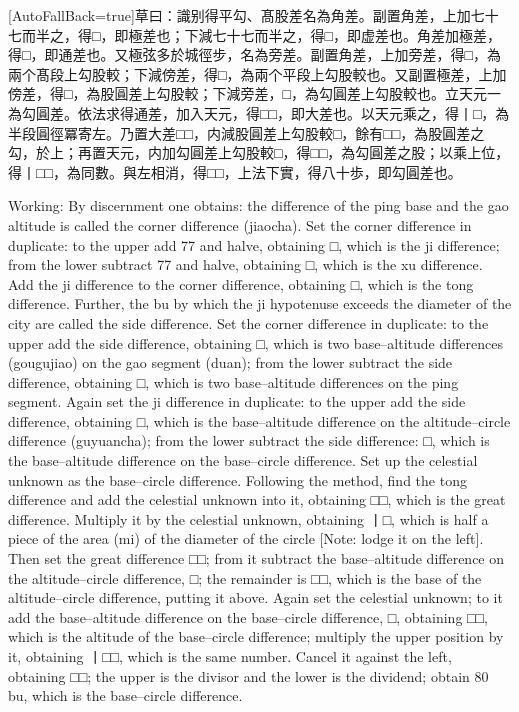 \documentclass[11pt]{article}
\newcommand{\zhsmall}{\footnotesize\color{black!70}}
\newcommand{\unitlabel}[1]{\marginpar{\raggedleft\tiny\color{gray}#1}}
\newenvironment{unitzh}{\par\CJKfontspec{Noto Serif CJK SC}[AutoFallBack=true]\large\linespread{1.25}\selectfont}{\par}
\newenvironment{uniten}{\par\small\color{black!85}}{\par\medskip}
\begin{document}
\begin{unitzh}\unitlabel{ceyuan-024.20}草曰：識别得平勾、髙股差名為角差。副置角差，上加七十七而半之，得□，即極差也；下減七十七而半之，得□，即虚差也。角差加極差，得□，即通差也。又極弦多於城徑步，名為旁差。副置角差，上加旁差，得□，為兩个髙段上勾股較；下減傍差，得□，為兩个平段上勾股較也。又副置極差，上加傍差，得□，為股圓差上勾股較；下減旁差，□，為勾圓差上勾股較也。立天元一為勾圓差。依法求得通差，加入天元，得□□，即大差也。以天元乘之，得丨□，為半段圓徑冪{\zhsmall 寄左}。乃置大差□□，内減股圓差上勾股較□，餘有□□，為股圓差之勾，於上；再置天元，内加勾圓差上勾股較□，得□□，為勾圓差之股；以乘上位，得丨□□，為同數。與左相消，得□□，上法下實，得八十歩，即勾圓差也。\end{unitzh}
\begin{uniten}Working: By discernment one obtains: the difference of the ping base and the gao altitude is called the corner difference (jiaocha). Set the corner difference in duplicate: to the upper add 77 and halve, obtaining □, which is the ji difference; from the lower subtract 77 and halve, obtaining □, which is the xu difference. Add the ji difference to the corner difference, obtaining □, which is the tong difference. Further, the bu by which the ji hypotenuse exceeds the diameter of the city are called the side difference. Set the corner difference in duplicate: to the upper add the side difference, obtaining □, which is two base–altitude differences (gougujiao) on the gao segment (duan); from the lower subtract the side difference, obtaining □, which is two base–altitude differences on the ping segment. Again set the ji difference in duplicate: to the upper add the side difference, obtaining □, which is the base–altitude difference on the altitude–circle difference (guyuancha); from the lower subtract the side difference: □, which is the base–altitude difference on the base–circle difference. Set up the celestial unknown as the base–circle difference. Following the method, find the tong difference and add the celestial unknown into it, obtaining □□, which is the great difference. Multiply it by the celestial unknown, obtaining 丨□, which is half a piece of the area (mi) of the diameter of the circle [Note: lodge it on the left]. Then set the great difference □□; from it subtract the base–altitude difference on the altitude–circle difference, □; the remainder is □□, which is the base of the altitude–circle difference, putting it above. Again set the celestial unknown; to it add the base–altitude difference on the base–circle difference, □, obtaining □□, which is the altitude of the base–circle difference; multiply the upper position by it, obtaining 丨□□, which is the same number. Cancel it against the left, obtaining □□; the upper is the divisor and the lower is the dividend; obtain 80 bu, which is the base–circle difference.\end{uniten}
\end{document}
